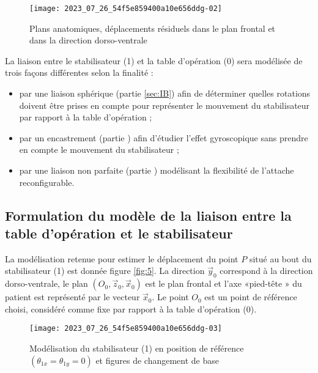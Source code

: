 \begin{figure}[!h]
\centering
\texttt{[image: 2023\_07\_26\_54f5e859400a10e656ddg-02]}
\caption{Plans anatomiques, déplacements résiduels dans le plan frontal et dans la direction dorso-ventrale\label{fig:04}}
\end{figure}



La liaison entre le stabilisateur (1) et la table d'opération (0) sera modélisée de trois façons différentes selon la finalité :

\begin{itemize}
  \item par une liaison sphérique (partie \ref{sec:IB}) afin de déterminer quelles rotations doivent être prises en compte pour représenter le mouvement du stabilisateur par rapport à la table d'opération ;
  \item par un encastrement (partie \label{sec:IIA}) afin d'étudier l'effet gyroscopique sans prendre en compte le mouvement du stabilisateur ;
  \item par une liaison non parfaite (partie \label{sec:IIC}) modélisant la flexibilité de l'attache reconfigurable.
\end{itemize}

\subsection{\label{sec:I.B}Formulation du modèle de la liaison entre la table d'opération et le stabilisateur}
La modélisation retenue pour estimer le déplacement du point $P$ situé au bout du stabilisateur (1) est donnée figure \ref{fig:5}. La direction $\vec{y}_{0}$ correspond à la direction dorso-ventrale, le plan $\left(O_{0}, \vec{z}_{0}, \vec{x}_{0}\right)$ est le plan frontal et l'axe «pied-tête » du patient est représenté par le vecteur $\vec{x}_{0}$. Le point $O_{0}$ est un point de référence choisi, considéré comme fixe par rapport à la table d'opération (0).

\begin{figure}[!h]
\centering
\texttt{[image: 2023\_07\_26\_54f5e859400a10e656ddg-03]}
\caption{Modélisation du stabilisateur (1) en position de référence $\left(\theta_{1 x}=\theta_{1 y}=0\right)$ et figures de changement de base\label{fig:05}}
\end{figure}


